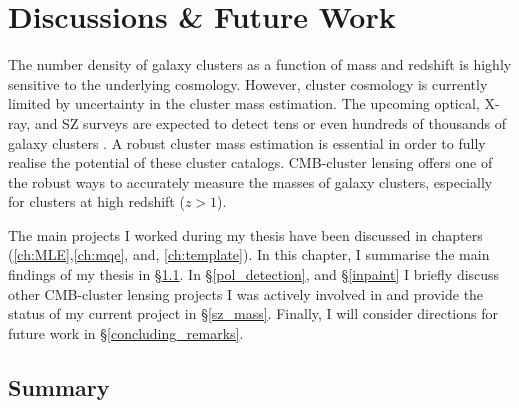 \chapter{Discussions \& Future Work}
The number density of galaxy clusters as a function of mass and redshift is highly sensitive to the underlying cosmology. However, cluster cosmology is currently limited by uncertainty in the cluster mass estimation. The upcoming optical, X-ray, and SZ surveys are expected to detect tens or even hundreds of thousands of galaxy clusters \citep{lsst09, cmbs4-sb1,erosita12,euclid10}. A robust cluster mass estimation is essential in order to fully realise the potential of these cluster catalogs.  CMB-cluster lensing offers one of the robust ways to accurately measure the masses of galaxy clusters, especially for clusters at high redshift ($z  > 1$). 

The main projects I worked during my thesis have been discussed in chapters (\ref{ch:MLE},\ref{ch:mqe}, and, \ref{ch:template}). 
In this chapter, I summarise the main findings of my thesis in \S\ref{sum}. 
 In \S\ref{pol_detection}, and \S\ref{inpaint} I briefly discuss other CMB-cluster lensing projects I was actively involved in and provide the status of my current project in \S\ref{sz_mass}.
Finally, I will consider directions for future work in \S\ref{concluding_remarks}.

\section{Summary}
\label{sum}

